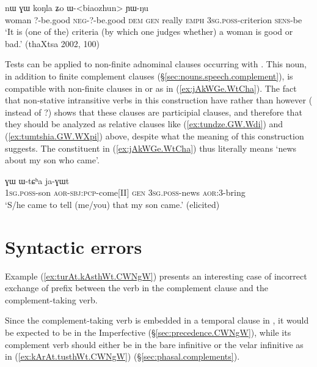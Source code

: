 \begin{exe}
\ex  \label{ex:biaozhun}
\gll   	[tɕʰeme kɯ-pe mɤ-kɯ-pe] nɯ ɣɯ koŋla ʑo ɯ-<biaozhun>   ɲɯ-ŋu   \\
woman ?-be.good \textsc{neg}-?-be.good \textsc{dem} \textsc{gen} really \textsc{emph} \textsc{3sg}.\textsc{poss}-criterion \textsc{sens}-be \\
\glt `It is (one of the) criteria (by which one judges whether) a woman is good or bad.' (thaXtsa 2002, 100)
\end{exe}

Tests can be applied to non-finite adnominal clauses occurring with . This noun, in addition to finite complement clauses (§\ref{sec:nouns.speech.complement}), is compatible with non-finite clauses in  or  as in (\ref{ex:jAkWGe.WtCha}). The fact that non-stative intransitive verbs in this construction have  rather than  however ( instead of ?) shows that these clauses are participial clauses, and therefore that they should be analyzed as relative clauses like (\ref{ex:tundze.GW.Wdi}) and (\ref{ex:tumtshia.GW.WXpi}) above, despite what the meaning of this construction suggests. The constituent  in (\ref{ex:jAkWGe.WtCha}) thus literally means `news about my son who came'.

\begin{exe}
\ex  \label{ex:jAkWGe.WtCha}
\gll  [a-tɕɯ jɤ-kɯ-ɣe] ɣɯ ɯ-tɕʰa ja-ɣɯt\\
\textsc{1sg}.\textsc{poss}-son \textsc{aor}-\textsc{sbj}:\textsc{pcp}-come[II]  \textsc{gen} \textsc{3sg}.\textsc{poss}-news \textsc{aor}:3\flobv{}-bring\\
 \glt `S/he came to tell (me/you) that my son came.' (elicited)
 \end{exe}



\section{Syntactic errors} \label{sec:syntactic.errors}
Example (\ref{ex:turAt.kAsthWt.CWNgW}) presents an interesting case of incorrect exchange of prefix between the verb in the complement clause and the complement-taking verb. 

Since the complement-taking verb  is embedded in a temporal clause in , it would be expected to be in the Imperfective (§\ref{sec:precedence.CWNgW}), while its complement verb should either be in the bare infinitive or the velar infinitive as in (\ref{ex:kArAt.tusthWt.CWNgW}) (§\ref{sec:phasal.complements}).


